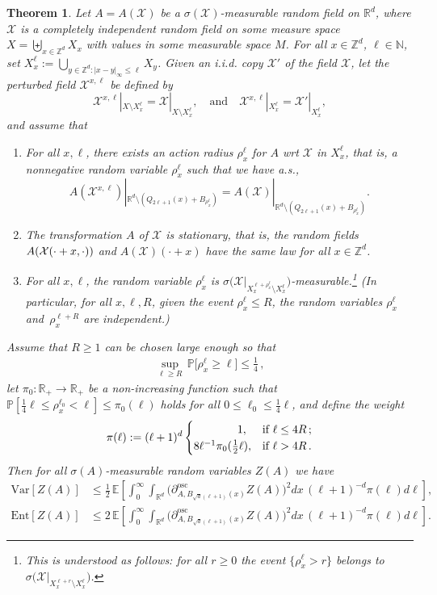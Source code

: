 \documentclass[10pt]{amsart}
\newtheorem{theo}{Theorem}[section]
\theoremstyle{definition}\newtheorem{defi}[theo]{Definition}\newtheorem{rema}[theo]{Remark}\newtheorem{exam}[theo]{Example}\newtheorem{exem}[theo]{Example}\newtheorem{nota}[theo]{Notation}
\newcommand{\N}{\mathbb N}
\newcommand{\R}{\mathbb R}
\newcommand{\Z}{\mathbb Z}
\newcommand{\expec}[1]{\mathbb{E}\left[#1 \right]}
\newcommand{\pr}[1]{\mathbb{P}\left[#1 \right]}
\newcommand{\prm}[1]{\mathbb{P}\big[#1 \big]}
\newcommand{\X}{\mathcal X}
\newcommand{\osc}{\partial^{\mathrm{osc}}}
\newcommand{\oscd}[1]{\mathrel{\osc_{#1}}}
\newcommand{\var}[1]{\mathrm{Var}\left[#1\right]}
\newcommand{\ent}[1]{\mathrm{Ent}\!\left[#1\right]}
\newcommand*{\alphenumi}{\renewcommand*{\theenumi}{\alph{enumi}}}
\begin{document}
\begin{theo}\label{th:ar-rpm}
Let $A=A(\X)$ be a $\sigma(\X)$-measurable random field on $\R^d$, where $\X$ is a completely independent random field on some measure space\linebreak$X=\biguplus_{x\in\Z^d}X_{x}$ with values in some measurable space $M$. For all $x\in\Z^d$, $\ell\in\N$, set $X_x^\ell:=\bigcup_{y\in\Z^d:|x-y|_\infty\le\ell}X_y$. Given an i.i.d. copy $\X'$ of the field $\X$, let the perturbed field $\X^{x,\ell}$ be defined by
\[
\X^{x,\ell}|_{X\setminus X_x^\ell}=\X|_{X\setminus X_x^\ell},\quad\text{and}\quad\X^{x,\ell}|_{X_x^\ell}=\X'|_{X_x^\ell},
\]
and assume that
\begin{enumerate}\alphenumi
\item \label{theo-2.8.1}For all $x,\ell$, there exists an action radius $\rho_x^\ell$ for $A$ wrt $\X$ in $X_x^\ell$, that is, a nonnegative random variable $\rho_x^\ell$ such that we have a.s.,
\[
A(\X^{x,\ell})|_{\R^d\setminus (Q_{2\ell+1}(x)+B_{\rho_x^\ell})}=A(\X)|_{\R^d\setminus (Q_{2\ell+1}(x)+B_{\rho_x^\ell})}.
\]
\item \label{theo-2.8.2}The transformation $A$ of $\X$ is stationary, that is, the random fields $A(\X\linebreak(\cdot+x,\cdot))$ and $A(\X)(\cdot+x)$ have the same law for all $x\in\Z^d$.
\item \label{theo-2.8.3}For all $x,\ell$, the random variable $\rho_x^\ell$ is $\sigma\Big(\X\big|_{X_x^{\ell+\rho_x^\ell}\setminus X_x^\ell}\Big)$-measurable.\footnote{This is understood as follows: for all $r\ge0$ the event $\{\rho_x^\ell>r\}$ belongs to $\sigma\Big(\X\big|_{X_x^{\ell+r}\setminus X_x^\ell}\Big)$.}
(In particular, for all $x,\ell,R$, given the event $\rho_x^\ell\le R$, the random variables $\rho_x^\ell$ and~$\rho_x^{\ell+R}$ are independent.)
\end{enumerate}
Assume that $R\ge1$ can be chosen large enough so that
\begin{align}\label{eq:choice-R}
\sup_{\ell\ge R}\,\prm{\rho_x^\ell\ge\ell}\le\tfrac14\,,
\end{align}
let $\pi_0:\R_+\to\R_+$ be a non-increasing function such that $\pr{\frac14\ell\le\rho_x^{\ell_0}<\ell}\le\pi_0(\ell)$ holds for all $0\le\ell_0\le\frac14\ell$, and define the weight 
\[
\pi(\ell):=(\ell+1)^{d}
\begin{cases}
\mkern70mu1,&\text{if }\ell\le 4R\,;\\8\ell^{-1}\pi_0(\frac12\ell),&\text{if }\ell>4R\,.
\end{cases}
\]
Then for all $\sigma(A)$-measurable random variables $Z(A)$ we have
\begin{align}
\var{Z(A)}&\le\frac12\,\expec{\int_0^\infty\int_{\R^d}{\Big(\oscd{A,B_{\sqrt d(\ell+1)}(x)}Z(A)\Big)^2}dx\,(\ell+1)^{-d}\pi(\ell) d\ell},\label{eq:AG-SG}
\\
\ent{Z(A)}&\le2\,\expec{\int_0^\infty\int_{\R^d}{\Big(\oscd{A,B_{\sqrt d(\ell+1)}(x)}Z(A)\Big)^2}dx\,(\ell+1)^{-d}\pi(\ell) d\ell}.\label{eq:AG-LSI}
\end{align}

\end{theo}
\end{document}
